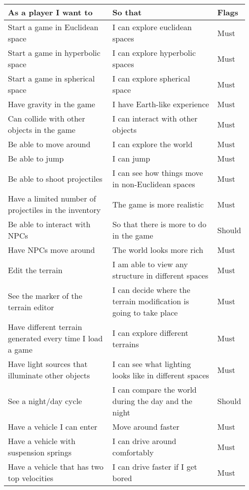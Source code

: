 \documentclass[12pt]{article}
\begin{document}
\begin{table}[H]
    \begin{tabular}{p{0.45\linewidth}|p{0.45\linewidth}|p{0.07\linewidth}}
    \hline
        \textbf{As a player I want to} & \textbf{So that} & \textbf{Flags} \\ \hline
        Start a game in Euclidean space & I can explore euclidean spaces & Must \\ \hline
        Start a game in hyperbolic space & I can explore hyperbolic spaces & Must \\ \hline
        Start a game in spherical space & I can explore spherical space & Must \\ \hline
        Have gravity in the game & I have Earth-like experience & Must \\ \hline
        Can collide with other objects in the game & I can interact with other objects & Must \\ \hline
        Be able to move around & I can explore the world & Must \\ \hline
        Be able to jump & I can jump & Must \\ \hline
        Be able to shoot projectiles & I can see how things move in non-Euclidean spaces & Must \\ \hline
        Have a limited number of projectiles in the inventory & The game is more realistic & Must \\ \hline
        Be able to interact with NPCs & So that there is more to do in the game & Should \\ \hline
        Have NPCs move around & The world looks more rich & Must \\ \hline
        Edit the terrain & I am able to view any structure in different spaces & Must \\ \hline
        See the marker of the terrain editor & I can decide where the terrain modification is going to take place & Must\\ \hline
        Have different terrain generated every time I load a game & I can explore different terrains & Must \\ \hline
        Have light sources that illuminate other objects & I can see what lighting looks like in different spaces & Must \\ \hline
        See a night/day cycle & I can compare the world during the day and the night & Should \\ \hline
        Have a vehicle I can enter & Move around faster & Must \\ \hline
        Have a vehicle with suspension springs & I can drive around comfortably & Must \\ \hline
        Have a vehicle that has two top velocities & I can drive faster if I get bored & Must\\ \hline
        

\end{tabular}
\end{table}
\end{document}
